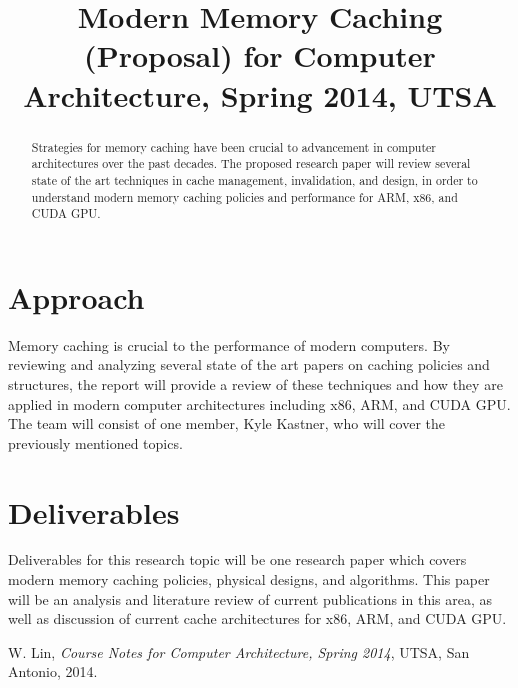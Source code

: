 \documentclass[conference]{IEEEtran}
\begin{document}
%
\title{Modern Memory Caching (Proposal) for Computer Architecture,
Spring 2014, UTSA}

\author{
}
\maketitle
\begin{abstract}
Strategies for memory caching have been crucial to advancement 
in computer architectures over the past decades. The proposed research 
paper will review several state of the art techniques in cache management, 
invalidation, and design, in order to understand modern memory caching 
policies and performance for ARM, x86, and CUDA GPU.
\end{abstract}
\IEEEpeerreviewmaketitle

\section{Approach}
Memory caching is crucial to the performance of modern computers. By reviewing 
and analyzing several state of the art papers on caching policies and 
structures, 
the report will provide a review of these techniques and how they are 
applied in modern computer architectures including x86, ARM, and CUDA GPU.
The team will consist of one member, Kyle Kastner, who will cover the previously
mentioned topics.

\section{Deliverables}
Deliverables for this research topic will be one research paper which covers
modern memory caching policies, physical designs, and algorithms. This paper 
will be an analysis and literature review of current publications in this area,
as well as discussion of current cache architectures for 
x86, ARM, and CUDA GPU.

\begin{thebibliography}{1}
W. Lin, \emph{Course Notes for Computer Architecture, Spring 2014}, UTSA, San Antonio, 2014.
\end{thebibliography}




\end{document}
